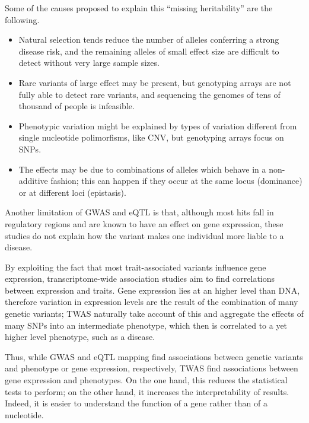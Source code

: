 \documentclass[../main.tex]{subfiles}
\begin{document}
Some of the causes proposed to explain this \enquote{missing 
	heritability} are the following.
\begin{itemize}
	\item Natural selection tends reduce the number of alleles 
		conferring a strong disease risk, and the remaining alleles of 
		small effect size are difficult to detect without very large 
		sample sizes.
	\item Rare variants of large effect may be present, but genotyping 
		arrays are not fully able to detect rare variants, and 
		sequencing the genomes of tens of thousand of people is 
		infeasible.
	\item Phenotypic variation might be explained by types of variation 
		different from single nucleotide polimorfisms, like CNV, but 
		genotyping arrays focus on SNPs.
	\item The effects may be due to combinations of alleles which behave 
		in a non-additive fashion; this can happen if they occur at the 
		same locus (dominance) or at different loci (epistasis).
\end{itemize}


Another limitation of GWAS and eQTL is that, although most hits fall in 
regulatory regions and are known to have an effect on gene expression, 
these studies do not explain how the variant makes one individual more 
liable to a disease.

By exploiting the fact that most trait-associated variants influence 
gene expression, transcriptome-wide association studies aim to find 
correlations between expression and traits. Gene expression lies at an 
higher level than DNA, therefore variation in expression levels are the 
result of the combination of many genetic variants; TWAS naturally take 
account of this and aggregate the effects of many SNPs into an 
intermediate phenotype, which then is correlated to a yet higher level 
phenotype, such as a disease.

Thus, while GWAS and eQTL mapping find associations between genetic 
variants and phenotype or gene expression, respectively, TWAS find 
associations between gene expression and phenotypes. On the one hand, 
this reduces the statistical tests to perform; on the other hand, it 
increases the interpretability of results. Indeed, it is easier to 
understand the function of a gene rather than of a nucleotide.
\end{document}

